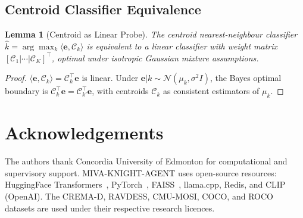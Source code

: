 \documentclass[10pt,conference]{IEEEtran}
\theoremstyle{ieeethm}
\newtheorem{lemma}[theorem]{Lemma}
\theoremstyle{ieeedef}
\theoremstyle{ieeeremark}
\begin{document}
\subsection{Centroid Classifier Equivalence}

\begin{lemma}[Centroid as Linear Probe]
\label{lem:centroid}
The centroid nearest-neighbour classifier $\hat{k} = \arg\max_k \langle \mathbf{e}, \mathcal{C}_k\rangle$ is equivalent to a linear classifier with weight matrix $[\mathcal{C}_1|\cdots|\mathcal{C}_K]^\top$, optimal under isotropic Gaussian mixture assumptions.
\end{lemma}
\begin{proof}
$\langle\mathbf{e}, \mathcal{C}_k\rangle = \mathcal{C}_k^\top \mathbf{e}$ is linear. Under $\mathbf{e}|k \sim \mathcal{N}(\mu_k, \sigma^2 I)$, the Bayes optimal boundary is $\mathcal{C}_k^\top \mathbf{e} = \mathcal{C}_{k'}^\top \mathbf{e}$, with centroids $\mathcal{C}_k$ as consistent estimators of $\mu_k$.
\end{proof}

\section*{Acknowledgements}

The authors thank Concordia University of Edmonton for computational and supervisory support. \textsc{MIVA-KNIGHT-AGENT} uses open-source resources: HuggingFace Transformers~\cite{wolf2020transformers}, PyTorch~\cite{paszke2019pytorch}, FAISS~\cite{johnson2019billion}, llama.cpp, Redis, and CLIP (OpenAI). The CREMA-D, RAVDESS, CMU-MOSI, COCO, and ROCO datasets are used under their respective research licences.
\end{document}
